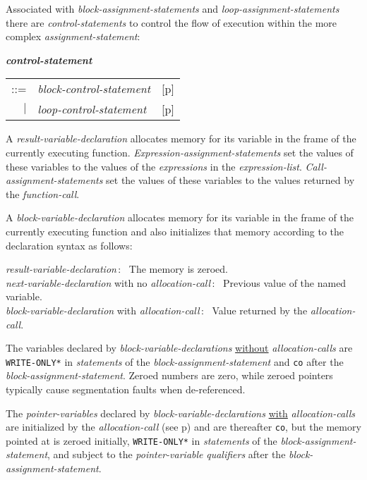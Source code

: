 \documentclass[12pt]{article}
\newcommand{\emkey}[1]{{\em \bfseries #1}}
\newcommand{\pagref}[1]{p\pageref{#1}}
\newcommand{\EOL}{\penalty \exhyphenpenalty}
\newenvironment{indpar}[1][0.3in]%
	{\begin{list}{}%
		     {\setlength{\itemsep}{0in}%
		      \setlength{\topsep}{0in}%
		      \setlength{\parsep}{1ex}%
		      \setlength{\labelwidth}{#1}%
		      \setlength{\leftmargin}{#1}%
		      \addtolength{\leftmargin}{\labelsep}}%
	 \item}%
	{\end{list}}
\begin{document}
Associated with {\em block-assignment-statements} and
{\em loop-assignment-statements}
there are {\em con\-trol-statements}
to control the flow of execution within the more complex
{\em assignment-state\-ment}:
\begin{indpar}
\emkey{control-statement}\label{CONTROL-STATEMENT}
    \begin{tabular}[t]{@{}rll}
    ::= & {\em block-control-statement}
        & [\pagref{BLOCK-CONTROL-STATEMENT}] \\
    $|$ & {\em loop-control-statement}
        & [\pagref{LOOP-CONTROL-STATEMENT}] \\
    \end{tabular}
\end{indpar}

A {\em result-variable-declaration} allocates memory for its variable
in the frame of the currently executing function.
{\em Expression-assignment-statements} set the values of these variables
to the values of the {\em expressions} in the {\em expression-list}.
{\em Call-assignment-statements} set the values of these variables
to the values returned by the {\em function-call}.

A {\em block-variable-declaration}
allocates memory for its variable
in the frame of the currently executing function and also initializes
that memory according to the declaration syntax as follows:
\begin{indpar}[0.05in]
{\em result-variable-declaration}\,:~
The memory is zeroed. \\
{\em next-variable-declaration} with no {\em allocation-call}\,:~
Previous value of the named variable. \\
{\em block-variable-declaration} with {\em allocation-call}\,:~
Value returned by the {\em allocation-call}.
\end{indpar}

The variables declared by {\em block-variable-declarations}
\underline{without} {\em allocation-calls}
are {\tt *WRITE-\EOL ONLY*} in {\em statements}
of the {\em block-assignment-statement} and {\tt co} after the
{\em block-assignment-statement}.
Zeroed numbers are zero, while zeroed pointers typically
cause segmentation faults when de-referenced.

The {\em pointer-variables} declared by {\em block-variable-declarations}
\underline{with} {\em allocation-calls}
are initialized by the {\em allocation-call}
(see \pagref{ALLOCATION-CALL}) and are thereafter
{\tt co}, but the memory
pointed at is zeroed initially, 
{\tt *WRITE-\EOL ONLY*} in {\em statements}
of the {\em block-assignment-statement}, and 
subject to the {\em pointer-variable} {\em qualifiers} after
the {\em block-assignment-statement}.
\end{document}
